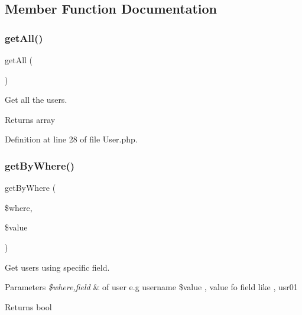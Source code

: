 \subsection{Member Function Documentation}
\mbox{\label{class_zest_1_1_auth_1_1_user_aba0d5b303383fb5b1fabb5fd01cd3800}} 
\subsubsection{\texorpdfstring{get\+All()}{getAll()}}
{\footnotesize\ttfamily get\+All (\begin{DoxyParamCaption}{ }\end{DoxyParamCaption})}

Get all the users.

\begin{DoxyReturn}{Returns}
array 
\end{DoxyReturn}


Definition at line 28 of file User.\+php.

\mbox{\label{class_zest_1_1_auth_1_1_user_ae74834371fb77ad40ef0845883352d19}} 
\subsubsection{\texorpdfstring{get\+By\+Where()}{getByWhere()}}
{\footnotesize\ttfamily get\+By\+Where (\begin{DoxyParamCaption}\item[{}]{\$where,  }\item[{}]{\$value }\end{DoxyParamCaption})}

Get users using specific field.


\begin{DoxyParams}{Parameters}
{\em \$where,field} & of user e.\+g username \$value , value fo field like , usr01\\
\hline
\end{DoxyParams}
\begin{DoxyReturn}{Returns}
bool 
\end{DoxyReturn}


